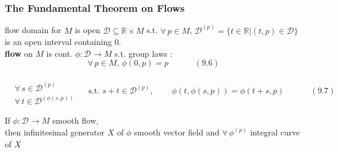 \subsubsection*{ The Fundamental Theorem on Flows }

flow domain for $M$ is open $\mathcal{D} \subseteq \mathbb{R} \times M$ s.t. $\forall \, p \in M$, $\mathcal{D}^{(p)} = \lbrace t \in \mathbb{R} | (t,p) \in \mathcal{D} \rbrace$ is an open interval containing $0$.  \\

\textbf{flow} on $M$ is cont. $\phi : \mathcal{D} \to M$ s.t. group laws : 
\begin{equation}
  \forall \, p \in M, \, \phi(0, p ) = p \quad \quad \quad \, (9.6)
\end{equation}

\begin{equation}
  \begin{aligned} & \quad \\ 
    & \forall \, s \in \mathcal{D}^{(p)} \\ 
    & \forall \, t \in \mathcal{D}^{ (\phi(s,p))} \end{aligned} \quad \text{ s.t. } s + t \in \mathcal{D}^{(p)}, \quad \quad \, \phi(t, \phi(s,p) ) = \phi(t+s, p ) \quad \quad \quad \, (9.7)
\end{equation}

\begin{proposition}[9.11] If $\phi: \mathcal{D} \to M$ smooth flow, \\
then infinitesimal generator $X$ of $\phi$ smooth vector field and $\forall \, \phi^{(p)}$ integral curve of $X$
\end{proposition}

